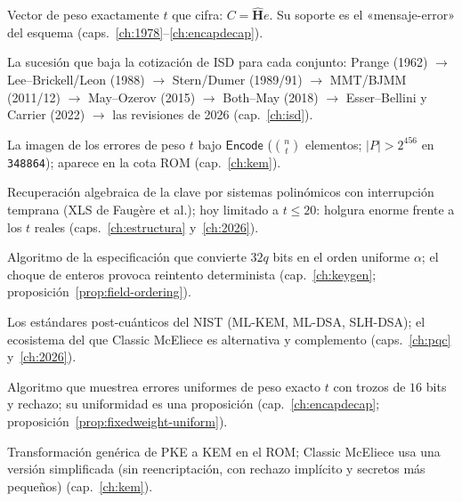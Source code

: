 \documentclass[11pt,a4paper,oneside]{report}
\newcommand{\Hmat}{\mathbf{H}}          %
\begin{document}
\begin{description}[leftmargin=2.6em,style=nextline,itemsep=2.5pt,parsep=0pt]
  \item[\textbf{$e$ (vector de error)}]
        Vector de peso exactamente $t$ que cifra:
        $C=\hat{\Hmat}e$. Su soporte es el «mensaje-error» del
        esquema (caps.~\ref{ch:1978}--\ref{ch:encapdecap}).

  \item[\textbf{Escalera de ataques}]
        La sucesión que baja la cotización de ISD para cada
        conjunto: Prange (1962) $\to$ Lee--Brickell/Leon (1988)
        $\to$ Stern/Dumer (1989/91) $\to$ MMT/BJMM (2011/12)
        $\to$ May--Ozerov (2015) $\to$ Both--May (2018)
        $\to$ Esser--Bellini y Carrier (2022) $\to$ las revisiones
        de 2026 (cap.~\ref{ch:isd}).

  \item[\textbf{Espacio de criptogramas} ($P$)]
        La imagen de los errores de peso $t$ bajo $\textsf{Encode}$
        ($\binom{n}{t}$ elementos; $|P|>2^{456}$ en
        \texttt{348864}); aparece en la cota ROM
        (cap.~\ref{ch:kem}).

  \item[\textbf{Faugère, ataque de}]
        Recuperación algebraica de la clave por sistemas
        polinómicos con interrupción temprana (XLS de Faugère et
        al.); hoy limitado a $t\le20$: holgura enorme frente a los
        $t$ reales (caps.~\ref{ch:estructura} y~\ref{ch:2026}).

  \item[\textbf{FieldOrdering}]
        Algoritmo de la especificación que convierte $32q$ bits en
        el orden uniforme $\alpha$; el choque de enteros provoca
        reintento determinista (cap.~\ref{ch:keygen};
        proposición~\ref{prop:field-ordering}).

  \item[\textbf{FIPS 203/204/205}]
        Los estándares post-cuánticos del NIST (ML-KEM, ML-DSA,
        SLH-DSA); el ecosistema del que Classic McEliece es
        alternativa y complemento (caps.~\ref{ch:pqc}
        y~\ref{ch:2026}).

  \item[\textbf{FixedWeight}]
        Algoritmo que muestrea errores uniformes de peso exacto
        $t$ con trozos de $16$ bits y rechazo; su uniformidad es
        una proposición (cap.~\ref{ch:encapdecap};
        proposición~\ref{prop:fixedweight-uniform}).

  \item[\textbf{FO (Fujisaki--Okamoto)}]
        Transformación genérica de PKE a KEM en el ROM; Classic
        McEliece usa una versión simplificada (sin reencriptación,
        con rechazo implícito y secretos más pequeños)
        (cap.~\ref{ch:kem}).


\end{description}
\end{document}
